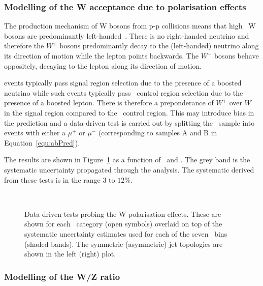 \subsubsection{Modelling of the W acceptance due to polarisation effects}

The production mechanism of W bosons from p-p collisions means that high \pt~W bosons are predominantly left-handed~\cite{lhW}. There is no right-handed neutrino and therefore the $W^{+}$ bosons 
predominantly decay to the (left-handed) neutrino along 
its direction of motion while the lepton points backwards. The $W^{-}$ bosons behave oppositely, decaying
to the lepton along its direction of motion. 

\wj events typically pass signal region selection due to
the presence of a boosted neutrino while such events typically
pass  \mj~control region selection due to the presence of a boosted lepton.
There is therefore a preponderance of $W^{+}$ over $W^{-}$ in the 
signal region compared to the \mj~control region. This may introduce bias
in the prediction and a data-driven test is carried out by splitting the \mj~sample into events 
with either a $\mu^{+}$ or $\mu^{-}$ (corresponding to samples A and B in Equation~\ref{equ:abPred}).

The results are shown in Figure~\ref{fig:closureMuPToMuM} as a function of \scalht~and \njet. 
The grey band is the systematic uncertainty propagated through the analysis.
The systematic derived from these tests is in the range $3$ to $12\%$.



\begin{figure}[h!]
  \begin{center}
    ~~
    \caption{Data-driven tests probing the W polarisation effects. 
      These are shown for each
      \njet~category (open symbols) overlaid on top of the systematic
      uncertainty estimates used for each of the seven \scalht~bins
      (shaded bands). 
      The symmetric (asymmetric) jet topologies are shown in the left (right) plot.       
    }
    \label{fig:closureMuPToMuM}
  \end{center} 
\end{figure}

\subsubsection{Modelling of the W/Z ratio}

